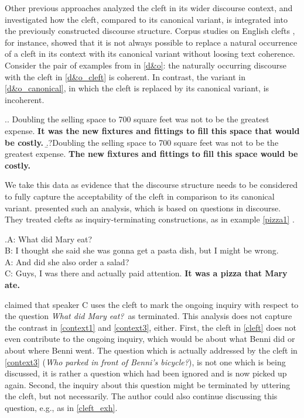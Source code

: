 \documentclass{salt}
\begin{document}
Other previous approaches analyzed the cleft in its wider discourse context, and investigated how the cleft, compared to its canonical variant, is integrated into the previously constructed discourse structure.  Corpus studies on English clefts \cite[a.o.,][]{prince_1978,hedberg_1990}, for instance, showed that it is not always possible to replace a natural occurrence of a cleft in its context with its canonical variant without loosing text coherence. Consider the pair of examples from \citet[471]{delin_oberlander_1995} in \ref{d&o}: the naturally occurring discourse with the cleft in \ref{d&o_cleft} is coherent. In contrast, the variant in \ref{d&o_canonical}, in which the cleft is replaced by its canonical variant, is incoherent. 

\ex.\label{d&o}\a.\label{d&o_cleft} Doubling the selling space to 700 square feet was not to be the greatest expense. \textbf{It was the new fixtures and fittings to fill this space that would be costly.}
\b.?\label{d&o_canonical}Doubling the selling space to 700 square feet was not to be the greatest expense. \textbf{The new fixtures and fittings to fill this space would be costly.}

We take this data as evidence that the discourse structure needs to be considered to fully capture the acceptability of the cleft in comparison to its canonical variant.
\cite{velleman_et_al_2012} presented such an analysis, which is based on questions in discourse. They treated clefts as inquiry-terminating constructions, as in example \ref{pizza1} \citep[a slightly adapted version of][449]{velleman_et_al_2012}. 

\ex.\label{pizza1}A: What did Mary eat?\\
B: I thought she said she was gonna get a pasta dish, but I might be wrong.\\
A: And did she also order a salad?\\
C: Guys, I was there and actually paid attention. \textbf{It was a pizza that
Mary ate.}

\citet[][]{velleman_et_al_2012} claimed that speaker C uses the cleft to mark the ongoing inquiry with respect to the question \textit{What did Mary eat?}~as terminated. This analysis does not capture the contrast in \ref{context1} and \ref{context3}, either. First, the cleft in \ref{cleft} does not even contribute to the ongoing inquiry, which would be about what Benni did or about where Benni went. The question which is actually addressed by the cleft in \ref{context3} (\textit{Who parked in front of Benni's bicycle?}), is not one which is being discussed, it is rather a question which had been ignored and is now picked up again. Second, the inquiry about this question might be terminated by uttering the cleft, but not necessarily. The author could also continue discussing this question, e.g., as in \ref{cleft_exh}. 
 
\end{document}
